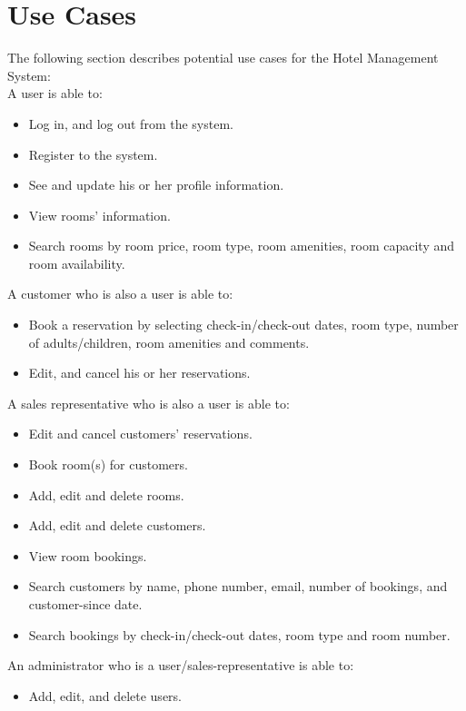 \section{Use Cases}
The following section describes potential use cases for the Hotel Management System:\\

\setlength{\parskip}{10pt plus 1pt minus 1pt}
A user is able to:
\begin{itemize} 
	\item Log in, and log out from the system.
	\item Register to the system.
	\item See and update his or her profile information.
	\item View rooms' information.
	\item Search rooms by room price, room type, room amenities, room capacity and room availability.
\end{itemize}


A customer who is also a user is able to:
\begin{itemize}
	\item Book a reservation by selecting check-in/check-out dates, room type, number of adults/children, room amenities and comments.
	\item Edit, and cancel his or her reservations.
\end{itemize}


A sales representative who is also a user is able to:
\begin{itemize}
	\item Edit and cancel customers' reservations.
	\item Book room(s) for customers.
	\item Add, edit and delete rooms.
	\item Add, edit and delete customers.
	\item View room bookings.
	\item Search customers by name, phone number, email, number of bookings, and customer-since date.
	\item Search bookings by check-in/check-out dates, room type and room number.
\end{itemize}

An administrator who is a user/sales-representative is able to:
\begin{itemize}
        \item Add, edit, and delete users.
\end{itemize}




